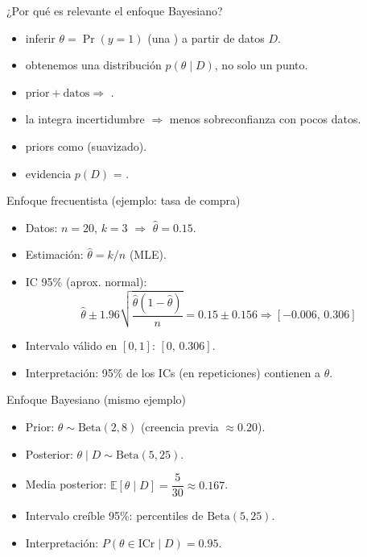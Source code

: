\begin{frame}{¿Por qué es relevante el enfoque Bayesiano?}
\begin{itemize}
  \item {} inferir \(\theta=\Pr(y=1)\) (una ) a partir de datos \(D\).
  \item {} obtenemos una distribución \(p(\theta\mid D)\), no solo un punto.
  \item {} \(\text{prior}+\text{datos}\Rightarrow\) .
  \item {} la  integra incertidumbre \(\Rightarrow\) menos sobreconfianza con pocos datos.
  \item {} priors como  (suavizado).
  \item {} evidencia \(p(D)\) = .
\end{itemize}
\end{frame}

\begin{frame}{Enfoque frecuentista (ejemplo: tasa de compra)}
\begin{itemize}
  \item Datos: \(n=20\), \(k=3\) \(\Rightarrow\) \(\hat\theta=0.15\).
  \item Estimación: \(\hat\theta=k/n\) (MLE).
  \item IC 95\% (aprox. normal):
  \[
    \hat\theta \pm 1.96\sqrt{\frac{\hat\theta(1-\hat\theta)}{n}}
    =0.15\pm 0.156\Rightarrow [-0.006,\,0.306]
  \]
  \item Intervalo válido en \([0,1]\): \([0,\,0.306]\).
  \item Interpretación: 95\% de los ICs (en repeticiones) contienen a \(\theta\).
\end{itemize}
\end{frame}

\begin{frame}{Enfoque Bayesiano (mismo ejemplo)}
\begin{itemize}
  \item Prior: \(\theta\sim\mathrm{Beta}(2,8)\) (creencia previa \(\approx 0.20\)).
  \item Posterior: \(\theta\mid D\sim\mathrm{Beta}(5,25)\).
  \item Media posterior: \(\mathbb{E}[\theta\mid D]=\dfrac{5}{30}\approx 0.167\).
  \item Intervalo creíble 95\%: percentiles de \(\mathrm{Beta}(5,25)\).
  \item Interpretación: \(P(\theta\in \text{ICr}\mid D)=0.95\).
\end{itemize}
\end{frame}


